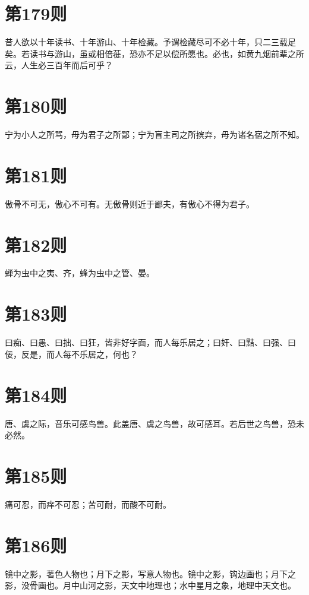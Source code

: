 \documentclass[12pt,a4paper]{ctexbook}
\begin{document}
\section{第179则}
昔人欲以十年读书、十年游山、十年检藏。予谓检藏尽可不必十年，只二三载足矣。若读书与游山，虽或相倍蓰，恐亦不足以偿所愿也。必也，如黄九烟前辈之所云，人生必三百年而后可乎？\par

\section{第180则}
宁为小人之所骂，毋为君子之所鄙；宁为盲主司之所摈弃，毋为诸名宿之所不知。\par

\section{第181则}
傲骨不可无，傲心不可有。无傲骨则近于鄙夫，有傲心不得为君子。\par

\section{第182则}
蝉为虫中之夷、齐，蜂为虫中之管、晏。\par

\section{第183则}
曰痴、曰愚、曰拙、曰狂，皆非好字面，而人每乐居之；曰奸、曰黠、曰强、曰佞，反是，而人每不乐居之，何也？\par

\section{第184则}
唐、虞之际，音乐可感鸟兽。此盖唐、虞之鸟兽，故可感耳。若后世之鸟兽，恐未必然。\par

\section{第185则}
痛可忍，而痒不可忍；苦可耐，而酸不可耐。\par

\section{第186则}
镜中之影，著色人物也；月下之影，写意人物也。镜中之影，钩边画也；月下之影，没骨画也。月中山河之影，天文中地理也；水中星月之象，地理中天文也。\par
\end{document}
